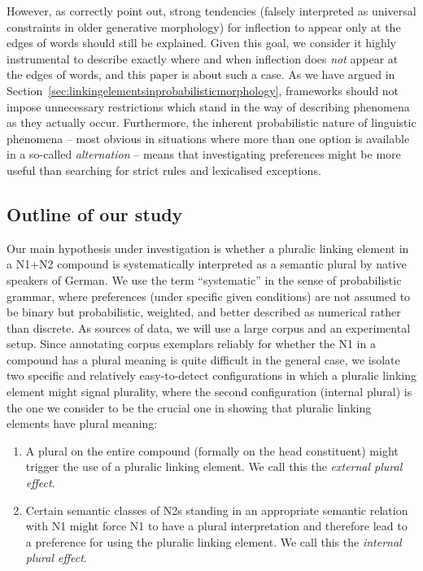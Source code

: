 However, as \textcite[5]{KirchnerNicoladis2009} correctly point out, strong tendencies (falsely interpreted as universal constraints in older generative morphology) for inflection to appear only at the edges of words should still be explained.
Given this goal, we consider it highly instrumental to describe exactly where and when inflection does \textit{not} appear at the edges of words, and this paper is about such a case. %
As we have argued in Section~\ref{sec:linkingelementsinprobabilisticmorphology}, frameworks should not impose unnecessary restrictions which stand in the way of describing phenomena as they actually occur.
Furthermore, the inherent probabilistic nature of linguistic phenomena -- most obvious in situations where more than one option is available in a so-called \textit{alternation} -- means that investigating preferences might be more useful than searching for strict rules and lexicalised exceptions.

\subsection{Outline of our study}

Our main hypothesis under investigation is whether a pluralic linking element in a N1+N2 compound is systematically interpreted as a semantic plural by native speakers of German.
We use the term ``systematic'' in the sense of probabilistic grammar, where preferences (under specific given conditions) are not assumed to be binary but probabilistic, weighted, and better described as numerical rather than discrete.
As sources of data, we will use a large corpus and an experimental setup.
Since annotating corpus exemplars reliably for whether the N1 in a compound has a plural meaning is quite difficult in the general case, we isolate two specific and relatively easy-to-detect configurations in which a pluralic linking element might signal plurality, where the second configuration (internal plural) is the one we consider to be the crucial one in showing that pluralic linking elements have plural meaning:

\vspace{\baselineskip}

\begin{enumerate}
  \item A plural on the entire compound (formally on the head constituent) might trigger the use of a pluralic linking element.
  We call this the \textit{external plural effect}.
  \item Certain semantic classes of N2s standing in an appropriate semantic relation with N1 might force N1 to have a plural interpretation and therefore lead to a preference for using the pluralic linking element.
  We call this the \textit{internal plural effect}.
\end{enumerate}

